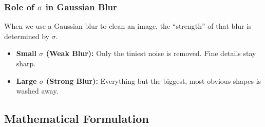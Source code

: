 \documentclass[12pt]{article}
\begin{document}
\subsubsection{Role of $\sigma$ in Gaussian Blur}

When we use a Gaussian blur to clean an image, the ``strength'' of that blur is determined by $\sigma$.

\begin{itemize}
    \item \textbf{Small $\sigma$ (Weak Blur):} Only the tiniest noise is removed. Fine details stay sharp.
    \item \textbf{Large $\sigma$ (Strong Blur):} Everything but the biggest, most obvious shapes is washed away.
\end{itemize}

\subsection{Mathematical Formulation}
\end{document}
